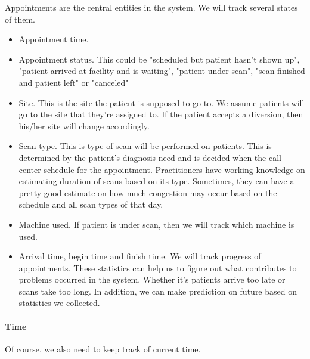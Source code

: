 Appointments are the central entities in the system. We will track several states of them.
\begin{itemize}
\item Appointment time.
\item Appointment status. This could be "scheduled but patient hasn't shown up", "patient arrived at facility and is waiting", "patient under scan", "scan finished and patient left" or "canceled"
\item Site. This is the site the patient is supposed to go to. We assume patients will go to the site that they're assigned to. If the patient accepts a diversion, then his/her site will change accordingly.
\item Scan type. This is type of scan will be performed on patients. This is determined by the patient's diagnosis need and is decided when the call center schedule for the appointment. Practitioners have working knowledge on estimating duration of scans based on its type. Sometimes, they can have a pretty good estimate on how much congestion may occur based on the schedule and all scan types of that day.
\item Machine used. If patient is under scan, then we will track which machine is used.
\item Arrival time, begin time and finish time. We will track progress of appointments. These statistics can help us to figure out what contributes to problems occurred in the system. Whether it's patients arrive too late or scans take too long. In addition, we can make prediction on future based on statistics we collected.
\end{itemize}

\paragraph{Time} Of course, we also need to keep track of current time.

